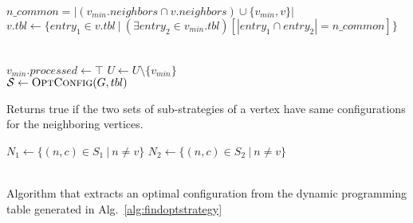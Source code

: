 \documentclass{article}
\newcommand{\strategy}{\ensuremath{\mathcal{S}}}
\newcommand{\set}[1]{\{#1\}}
\begin{document}
\begin{algorithm}
\begin{algorithmic}[1]
			\State $n\_common = |(v_{min}.neighbors \cap v.neighbors) \cup
			\set{v_{min}, v}|$
			\State $v.tbl \leftarrow \set{entry_1\in v.tbl ~|~ (\exists
			entry_2 \in v_{min}.tbl)[|entry_1 \cap entry_2| = n\_common]}$
		\EndFor

		\\
		\State $v_{min}.processed \leftarrow \top$
		\State $U \leftarrow U\setminus \set{v_{min}}$
	\EndWhile
	\\
	\State $\strategy \leftarrow \Call{OptConfig}{G, tbl}$ 
	\State \Return{\strategy}

	\EndProcedure
\end{algorithmic}

\end{algorithm}

\begin{algorithm}
	\caption{\label{alg:has-same-neigh-config}Returns true if the two
	sets of sub-strategies of a vertex have same configurations for the
	neighboring vertices.}

	\begin{algorithmic}[1]
					\State $N_1 \leftarrow \set{(n,c)\in S_1~|~n \not= v}$
					\State $N_2 \leftarrow \set{(n,c)\in S_2~|~n \not= v}$
					\\

						\State \Return{$\bot$}
					\EndIf
				\EndFor
			\EndFor
			\\
			\State \Return{$\top$}
		\EndProcedure
	\end{algorithmic}
\end{algorithm}

\begin{algorithm}
	\caption{\label{alg:optconfig}Algorithm that extracts an optimal configuration
	from the dynamic programming table generated in Alg.~\ref{alg:findoptstrategy}}

	\begin{algorithmic}

		\EndProcedure

	\end{algorithmic}
\end{algorithm}
\end{document}
